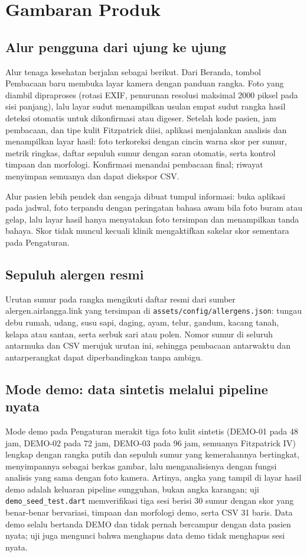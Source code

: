 \documentclass[11pt,a4paper]{article}
\begin{document}
\section{Gambaran Produk}

\subsection{Alur pengguna dari ujung ke ujung}

Alur tenaga kesehatan berjalan sebagai berikut. Dari Beranda, tombol Pembacaan
baru membuka layar kamera dengan panduan rangka. Foto yang diambil dipraproses
(rotasi EXIF, penurunan resolusi maksimal 2000 piksel pada sisi panjang), lalu
layar sudut menampilkan usulan empat sudut rangka hasil deteksi otomatis untuk
dikonfirmasi atau digeser. Setelah kode pasien, jam pembacaan, dan tipe kulit
Fitzpatrick diisi, aplikasi menjalankan analisis dan menampilkan layar hasil:
foto terkoreksi dengan cincin warna skor per sumur, metrik ringkas, daftar sepuluh
sumur dengan saran otomatis, serta kontrol timpaan dan morfologi. Konfirmasi
menandai pembacaan final; riwayat menyimpan semuanya dan dapat diekspor CSV.

Alur pasien lebih pendek dan sengaja dibuat tumpul informasi: buka aplikasi pada
jadwal, foto terpandu dengan peringatan bahasa awam bila foto buram atau gelap,
lalu layar hasil hanya menyatakan foto tersimpan dan menampilkan tanda bahaya.
Skor tidak muncul kecuali klinik mengaktifkan sakelar skor sementara pada
Pengaturan.

\subsection{Sepuluh alergen resmi}

Urutan sumur pada rangka mengikuti daftar resmi dari sumber
alergen.airlangga.link yang tersimpan di \texttt{assets/config/allergens.json}:
tungau debu rumah, udang, susu sapi, daging, ayam, telur, gandum, kacang tanah,
kelapa atau santan, serta serbuk sari atau polen. Nomor sumur di seluruh
antarmuka dan CSV merujuk urutan ini, sehingga pembacaan antarwaktu dan
antarperangkat dapat diperbandingkan tanpa ambigu.

\subsection{Mode demo: data sintetis melalui pipeline nyata}

Mode demo pada Pengaturan merakit tiga foto kulit sintetis (DEMO-01 pada 48 jam,
DEMO-02 pada 72 jam, DEMO-03 pada 96 jam, semuanya Fitzpatrick IV) lengkap dengan
rangka putih dan sepuluh sumur yang kemerahannya bertingkat, menyimpannya sebagai
berkas gambar, lalu menganalisisnya dengan fungsi analisis yang sama dengan foto
kamera. Artinya, angka yang tampil di layar hasil demo adalah keluaran pipeline
sungguhan, bukan angka karangan; uji \texttt{demo\_seed\_test.dart} memverifikasi
tiga sesi berisi 30 sumur dengan skor yang benar-benar bervariasi, timpaan dan
morfologi demo, serta CSV 31 baris. Data demo selalu bertanda DEMO dan tidak
pernah bercampur dengan data pasien nyata; uji juga mengunci bahwa menghapus
data demo tidak menghapus sesi nyata.
\end{document}
